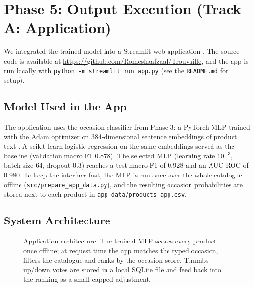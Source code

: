\section{Phase 5: Output Execution (Track A: Application)}

We integrated the trained model into a Streamlit web application \cite{streamlit}. The source code is available at
\url{https://github.com/Romeshaafzaal/Trouvaille}, and the app is run locally with \texttt{python -m streamlit run app.py}
(see the \texttt{README.md} for setup).

\subsection{Model Used in the App}
The application uses the occasion classifier from Phase 3: a PyTorch MLP \cite{paszke2019pytorch} trained with the Adam optimizer \cite{kingma2015adam}
on 384-dimensional sentence embeddings of product text \cite{reimers2019sbert,wang2020minilm}. A scikit-learn \cite{pedregosa2011sklearn}
logistic regression on the same embeddings served as the baseline (validation macro F1 0.878). The selected MLP (learning rate $10^{-3}$, batch size 64, dropout 0.3)
reaches a test macro F1 of 0.928 and an AUC-ROC of 0.980. To keep the interface fast, the MLP is run once over the whole catalogue offline
(\texttt{src/prepare\_app\_data.py}), and the resulting occasion probabilities are stored next to each product in \texttt{app\_data/products\_app.csv}.

\subsection{System Architecture}
\begin{figure}[!htbp]\centering
{}
\caption{Application architecture. The trained MLP scores every product once offline; at request time the app matches the typed occasion, filters the catalogue and ranks by the occasion score. Thumbs up/down votes are stored in a local SQLite file and feed back into the ranking as a small capped adjustment.}
\end{figure}


